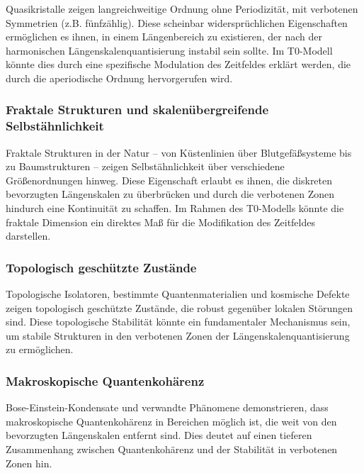 \documentclass[12pt,a4paper]{article}
\begin{document}
	Quasikristalle zeigen langreichweitige Ordnung ohne Periodizität, mit verbotenen Symmetrien (z.B. fünfzählig). Diese scheinbar widersprüchlichen Eigenschaften ermöglichen es ihnen, in einem Längen\-bereich zu existieren, der nach der harmonischen Längen\-skalen\-quantisierung instabil sein sollte. Im T0-Modell könnte dies durch eine spezifische Modulation des Zeitfeldes erklärt werden, die durch die aperiodische Ordnung hervorgerufen wird.
	
	\subsubsection{Fraktale Strukturen und skalenübergreifende Selbstähnlichkeit}
	\label{subsubsec:fraktale_strukturen}
	
	Fraktale Strukturen in der Natur – von Küstenlinien über Blutgefäßsysteme bis zu Baumstrukturen – zeigen Selbstähnlichkeit über verschiedene Größen\-ordnungen hinweg. Diese Eigenschaft erlaubt es ihnen, die diskreten bevorzugten Längen\-skalen zu \glqq überbrücken\grqq{} und durch die verbotenen Zonen hindurch eine Kontinuität zu schaffen. Im Rahmen des T0-Modells könnte die fraktale Dimension ein direktes Maß für die Modifikation des Zeitfeldes darstellen.
	
	\subsubsection{Topologisch geschützte Zustände}
	\label{subsubsec:topologische_zustaende}
	
	Topologische Isolatoren, bestimmte Quantenmaterialien und kosmische Defekte zeigen topologisch geschützte Zustände, die robust gegenüber lokalen Störungen sind. Diese topologische Stabilität könnte ein fundamentaler Mechanismus sein, um stabile Strukturen in den verbotenen Zonen der Längen\-skalen\-quantisierung zu ermöglichen.
	
	\subsubsection{Makroskopische Quantenkohärenz}
	\label{subsubsec:quantenkohaerenz}
	
	Bose-Einstein-Kondensate und verwandte Phänomene demonstrieren, dass makroskopische Quanten\-kohärenz in Bereichen möglich ist, die weit von den bevorzugten Längen\-skalen entfernt sind. Dies deutet auf einen tieferen Zusammenhang zwischen Quanten\-kohärenz und der Stabilität in verbotenen Zonen hin.
	
\end{document}
